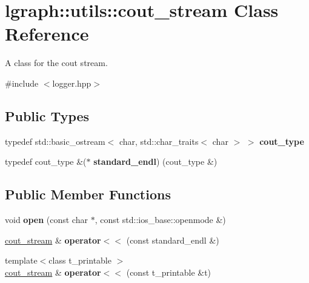 \hypertarget{classlgraph_1_1utils_1_1cout__stream}{}\section{lgraph\+:\+:utils\+:\+:cout\+\_\+stream Class Reference}
\label{classlgraph_1_1utils_1_1cout__stream}


A class for the cout stream.  




{\ttfamily \#include $<$logger.\+hpp$>$}

\subsection*{Public Types}
\begin{DoxyCompactItemize}
\item 
typedef std\+::basic\+\_\+ostream$<$ char, std\+::char\+\_\+traits$<$ char $>$ $>$ {\bfseries cout\+\_\+type}\hypertarget{classlgraph_1_1utils_1_1cout__stream_a567e84e8f695f9f06e25a90385bd36bc}{}\label{classlgraph_1_1utils_1_1cout__stream_a567e84e8f695f9f06e25a90385bd36bc}

\item 
typedef cout\+\_\+type \&($\ast$ {\bfseries standard\+\_\+endl}) (cout\+\_\+type \&)\hypertarget{classlgraph_1_1utils_1_1cout__stream_a3dc3129e1e5c26c370223e29dbdefe75}{}\label{classlgraph_1_1utils_1_1cout__stream_a3dc3129e1e5c26c370223e29dbdefe75}

\end{DoxyCompactItemize}
\subsection*{Public Member Functions}
\begin{DoxyCompactItemize}
\item 
void {\bfseries open} (const char $\ast$, const std\+::ios\+\_\+base\+::openmode \&)\hypertarget{classlgraph_1_1utils_1_1cout__stream_a818a63700e577a13db63088353ce4098}{}\label{classlgraph_1_1utils_1_1cout__stream_a818a63700e577a13db63088353ce4098}

\item 
\hyperlink{classlgraph_1_1utils_1_1cout__stream}{cout\+\_\+stream} \& {\bfseries operator$<$$<$} (const standard\+\_\+endl \&)\hypertarget{classlgraph_1_1utils_1_1cout__stream_a6e35f97a622bccec72247d6f9e6ca2c8}{}\label{classlgraph_1_1utils_1_1cout__stream_a6e35f97a622bccec72247d6f9e6ca2c8}

\item 
{\footnotesize template$<$class t\+\_\+printable $>$ }\\\hyperlink{classlgraph_1_1utils_1_1cout__stream}{cout\+\_\+stream} \& {\bfseries operator$<$$<$} (const t\+\_\+printable \&t)\hypertarget{classlgraph_1_1utils_1_1cout__stream_a88f6cf6d54312f795ccbff57724d51e4}{}\label{classlgraph_1_1utils_1_1cout__stream_a88f6cf6d54312f795ccbff57724d51e4}

\end{DoxyCompactItemize}


